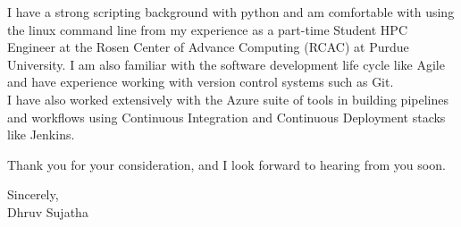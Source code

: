 \documentclass[a4paper]{article}
\begin{document}
I have a strong scripting background with python and am comfortable with using the linux command line from my experience as a part-time Student HPC Engineer 
at the Rosen Center of Advance Computing (RCAC) at Purdue University.
I am also familiar with the software development life cycle like Agile and have experience working with version control systems such as Git. \\
I have also worked extensively with the Azure suite of tools in building pipelines and workflows using Continuous Integration and Continuous Deployment stacks like Jenkins.\\

\vspace*{20pt}

Thank you for your consideration, and I look forward to hearing from you soon.

\vspace*{20pt}

Sincerely,\\
Dhruv Sujatha\\
\end{document}
